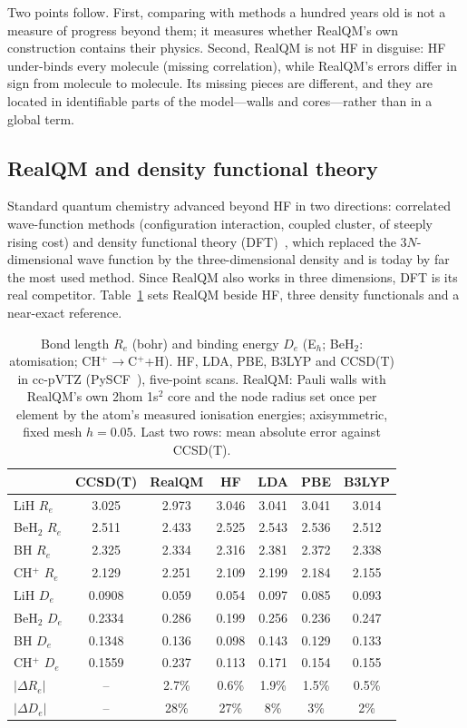 Two points follow. First, comparing with methods a hundred years old is not a measure of progress
beyond them; it measures whether RealQM's own construction contains their physics. Second, RealQM is
not HF in disguise: HF under-binds every molecule (missing correlation), while RealQM's errors differ in
sign from molecule to molecule. Its missing pieces are different, and they are located in identifiable
parts of the model---walls and cores---rather than in a global term.

\subsection{RealQM and density functional theory}

Standard quantum chemistry advanced beyond HF in two directions: correlated wave-function methods
(configuration interaction, coupled cluster, of steeply rising cost) and density functional theory
(DFT)~\cite{hk,ks}, which replaced the $3N$-dimensional wave function by the three-dimensional density
and is today by far the most used method. Since RealQM also works in three dimensions, DFT is its
real competitor. Table~\ref{tab:dft} sets RealQM beside HF, three density functionals and a near-exact
reference.

\begin{table}[h]
\centering\small
\caption{Bond length $R_e$ (bohr) and binding energy $D_e$ (E$_h$; BeH$_2$: atomisation; CH$^+\to$C$^+$+H).
HF, LDA, PBE, B3LYP and CCSD(T) in cc-pVTZ (PySCF~\cite{pyscf}), five-point scans. RealQM: Pauli walls with
RealQM's own 2hom 1s$^2$ core and the node radius set once per element by the atom's measured ionisation
energies; axisymmetric, fixed mesh $h=0.05$. Last two rows: mean absolute error against CCSD(T).}
\label{tab:dft}
\begin{tabular}{lcccccc}
\hline
 & CCSD(T) & RealQM & HF & LDA & PBE & B3LYP\\
\hline
LiH $R_e$ & 3.025 & 2.973 & 3.046 & 3.041 & 3.041 & 3.014\\
BeH$_2$ $R_e$ & 2.511 & 2.433 & 2.525 & 2.543 & 2.536 & 2.512\\
BH $R_e$ & 2.325 & 2.334 & 2.316 & 2.381 & 2.372 & 2.338\\
CH$^+$ $R_e$ & 2.129 & 2.251 & 2.109 & 2.199 & 2.184 & 2.155\\
LiH $D_e$ & 0.0908 & 0.059 & 0.054 & 0.097 & 0.085 & 0.093\\
BeH$_2$ $D_e$ & 0.2334 & 0.286 & 0.199 & 0.256 & 0.236 & 0.247\\
BH $D_e$ & 0.1348 & 0.136 & 0.098 & 0.143 & 0.129 & 0.133\\
CH$^+$ $D_e$ & 0.1559 & 0.237 & 0.113 & 0.171 & 0.154 & 0.155\\
\hline
$|\Delta R_e|$ & -- & 2.7\% & 0.6\% & 1.9\% & 1.5\% & 0.5\%\\
$|\Delta D_e|$ & -- & 28\% & 27\% & 8\% & 3\% & 2\%\\
\hline
\end{tabular}
\end{table}

